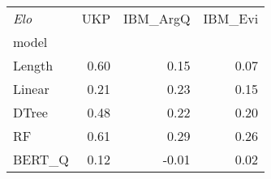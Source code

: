 \begin{tabular}{lrrr}
\toprule
\textit{Elo} &   UKP &  IBM\_ArgQ &  IBM\_Evi \\
model  &       &           &          \\
\midrule
Length &  0.60 &      0.15 &     0.07 \\
Linear &  0.21 &      0.23 &     0.15 \\
DTree  &  0.48 &      0.22 &     0.20 \\
RF     &  0.61 &      0.29 &     0.26 \\
BERT\_Q &  0.12 &     -0.01 &     0.02 \\
\bottomrule
\end{tabular}
